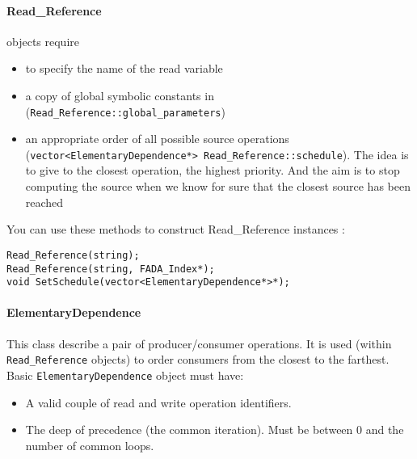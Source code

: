 \paragraph{Read\_Reference}
objects require 
\begin{itemize}
 \item to specify the name of the read variable
 \item a copy of global symbolic constants in (\verb|Read_Reference::global_parameters|)
 \item an appropriate order of all possible source operations \\(\verb|vector<ElementaryDependence*> Read_Reference::schedule|). The idea is to give to the closest operation, the highest priority. And the aim is to stop computing the source when we know for sure that the closest source has been reached
\end{itemize}

You can use these methods to construct Read\_Reference instances :
\begin{footnotesize}\begin{lstlisting}[frame=single,framerule=0pt]
Read_Reference(string);
Read_Reference(string, FADA_Index*);
void SetSchedule(vector<ElementaryDependence*>*);
\end{lstlisting}
\end{footnotesize}
\paragraph{ElementaryDependence}
This class describe a pair of producer/consumer operations. It is used (within \verb|Read_Reference| objects) to order consumers from the closest to the farthest.
Basic \verb|ElementaryDependence| object must have:
\begin{itemize}
 \item A valid couple of read and write operation identifiers.
 \item The deep of precedence (the common iteration). Must be between 0 and the number of common loops.
\end{itemize}



